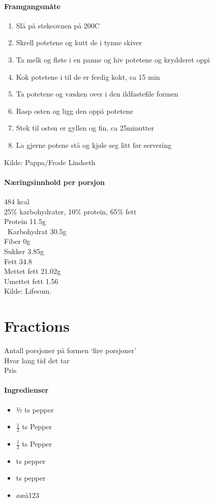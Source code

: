 \documentclass[12pt,a4paper]{book}
\begin{document}
\paragraph{Framgangsmåte}
\begin{enumerate}[noitemsep]
	\item Slå på stekeovnen på 200\degree C
	\item Skrell potetene og kutt de i tynne skiver
	\item Ta melk og fløte i en panne og hiv potetene og krydderet oppi
	\item Kok potetene i til de er ferdig kokt, ca 15 min
	\item Ta potetene og væsken over i den ildfastefile formen
	\item Rasp osten og ligg den oppå potetene
	\item Stek til osten er gyllen og fin, ca 25minutter
	\item La gjerne potene stå og kjøle seg litt før servering
\end{enumerate}

Kilde: Pappa/Frode Lindseth\\


\paragraph{Næringsinnhold per porsjon}
484 kcal\\
25\% karbohydrater, 10\% protein, 65\% fett\\
Protein 11.5g\\\
Karbohydrat 30.5g\\
Fiber 0g\\
Sukker 3.85g\\
Fett 34.8\\
Mettet fett 21.02g\\
Umettet fett 1.56\\
Kilde: Lifesum.
\clearpage{}
\clearpage{}\section{﻿Fractions}
\label{oppskrifsmal}

Antall porsjoner på formen `fire porsjoner'\\
Hvor lang tid det tar\\
Pris

\paragraph{Ingredienser}
\begin{itemize}[noitemsep]
	\item ½ ts pepper


	\item	 $\frac{1}{2}$  ts Pepper

	\item	 \(\frac{1}{2}\) ts Pepper

	\item {} ts pepper

	\item {} ts pepper

	\item øæå123
\end{itemize}
\end{document}
